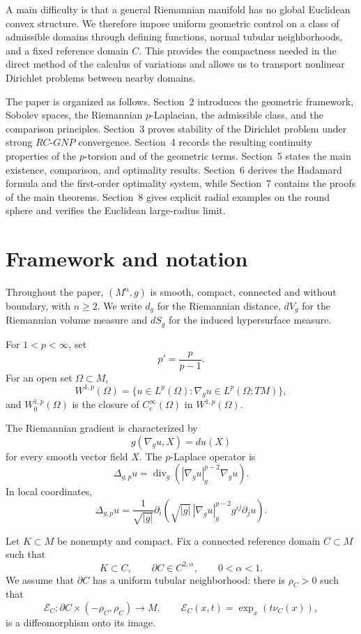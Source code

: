 \documentclass{article}
\begin{document}
A main difficulty is that a general Riemannian manifold has no global
Euclidean convex structure. We therefore impose uniform geometric
control on a class of admissible domains through defining functions,
normal tubular neighborhoods, and a fixed reference domain $C$.
This provides the compactness needed in the direct method of the
calculus of variations and allows us to transport nonlinear Dirichlet
problems between nearby domains.

The paper is organized as follows. Section~2 introduces the geometric
framework, Sobolev spaces, the Riemannian $p$-Laplacian, the admissible
class, and the comparison principles. Section~3 proves stability of the
Dirichlet problem under strong $RC$-$GNP$ convergence. Section~4 records
the resulting continuity properties of the $p$-torsion and of the
geometric terms. Section~5 states the main existence, comparison, and
optimality results. Section~6 derives the Hadamard formula and the
first-order optimality system, while Section~7 contains the proofs of
the main theorems. Section~8 gives explicit radial examples on the
round sphere and verifies the Euclidean large-radius limit.

\section{Framework and notation}

Throughout the paper, $(M^n,g)$ is smooth, compact, connected and
without boundary, with $n\geq2$. We write $d_g$ for the Riemannian
distance, $dV_g$ for the Riemannian volume measure and $dS_g$ for the
induced hypersurface measure.

For $1<p<\infty$, set
\[
p'=\frac{p}{p-1}.
\]
For an open set $\Omega\subset M$,
\[
W^{1,p}(\Omega)
=
\{u\in L^p(\Omega):\nabla_g u\in L^p(\Omega;TM)\},
\]
and $W_0^{1,p}(\Omega)$ is the closure of $C_c^\infty(\Omega)$ in
$W^{1,p}(\Omega)$.

The Riemannian gradient is characterized by
\[
g(\nabla_g u,X)=du(X)
\]
for every smooth vector field $X$. The $p$-Laplace operator is
\[
\Delta_{g,p}u
=
\operatorname{div}_g\left(
|\nabla_g u|_g^{p-2}\nabla_g u
\right).
\]
In local coordinates,
\[
\Delta_{g,p}u
=
\frac1{\sqrt{|g|}}
\partial_i
\left(
\sqrt{|g|}\,
|\nabla_g u|_g^{p-2}
g^{ij}\partial_j u
\right).
\]

Let $K\subset M$ be nonempty and compact. Fix a connected reference domain
$C\subset M$ such that
\[
K\subset C,
\qquad
\partial C\in C^{2,\alpha},
\qquad 0<\alpha<1.
\]
We assume that $\partial C$ has a uniform tubular neighborhood:
there is $\rho_C>0$ such that
\[
\mathcal E_C:\partial C\times(-\rho_C,\rho_C)\to M,
\qquad
\mathcal E_C(x,t)=\exp_x(t\nu_C(x)),
\]
is a diffeomorphism onto its image.
\end{document}

